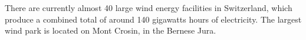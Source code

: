 There are currently almost 40 large wind energy facilities in Switzerland, which produce a combined total of around 140 gigawatts hours of electricity.
The largest wind park is located on Mont Crosin, in the Bernese Jura.

